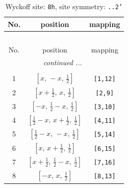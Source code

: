 \documentclass[fleqn,8pt]{jsarticle}
\begin{document}
\begin{longtable}{ccc}
\caption{Wyckoff site: {\tt 8h}, site symmetry: {\tt ..2'}}
 \\
 \hline \hline
No. & position & mapping \\ \hline \endfirsthead

\multicolumn{2}{l}{\tablename\ \thetable{}} \\
 \hline \hline
No. & position & mapping \\ \hline \endhead

 \hline \hline
\multicolumn{2}{r}{\footnotesize\it continued ...} \\ \endfoot

 \hline \hline
\multicolumn{2}{r}{} \\ \endlastfoot

1 & $\left[ x,\, - x,\, \frac{1}{2} \right]$ & {\tt [1,12]} \\ \hline
2 & $\left[ x + \frac{1}{2},\, x,\, \frac{1}{2} \right]$ & {\tt [2,9]} \\ \hline
3 & $\left[ - x,\, \frac{1}{2} - x,\, \frac{1}{2} \right]$ & {\tt [3,10]} \\ \hline
4 & $\left[ \frac{1}{2} - x,\, x + \frac{1}{2},\, \frac{1}{2} \right]$ & {\tt [4,11]} \\ \hline
5 & $\left[ \frac{1}{2} - x,\, - x,\, \frac{1}{2} \right]$ & {\tt [5,14]} \\ \hline
6 & $\left[ x,\, x + \frac{1}{2},\, \frac{1}{2} \right]$ & {\tt [6,15]} \\ \hline
7 & $\left[ x + \frac{1}{2},\, \frac{1}{2} - x,\, \frac{1}{2} \right]$ & {\tt [7,16]} \\ \hline
8 & $\left[ - x,\, x,\, \frac{1}{2} \right]$ & {\tt [8,13]} \\
\end{longtable}
\renewcommand{\arraystretch}{1.2}
\end{document}
